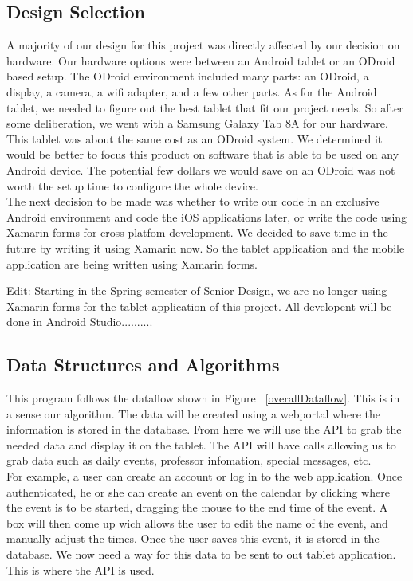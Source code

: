 \subsection{Design Selection}
A majority of our design for this project was directly affected by our decision on hardware.  Our hardware options were between an Android tablet or an ODroid based setup. The ODroid environment included many parts: an ODroid, a display, a camera, a wifi adapter, and a few other parts. As for the Android tablet, we needed to figure out the best tablet that fit our project needs. So after some deliberation, we went with a Samsung Galaxy Tab 8A for our hardware.  This tablet was about the same cost as an ODroid system.  We determined it would be better to focus this product on software that is able to be used on any Android device.  The potential few dollars we would save on an ODroid was not worth the setup time to configure the whole device.\\

The next decision to be made was whether to write our code in an exclusive Android environment and code the iOS applications later, or write the code using Xamarin forms for cross platfom development. We decided to save time in the future by writing it using Xamarin now. So the tablet application and the mobile application are being written using Xamarin forms.

Edit: Starting in the Spring semester of Senior Design, we are no longer using Xamarin forms for the tablet application of this project.  All developent will be done in Android Studio..........

 
\subsection{Data Structures and Algorithms}
This program follows the dataflow shown in Figure ~\ref{overallDataflow}. This is in a sense our algorithm.  The data will be created using a webportal where the information is stored in the database.  From here we will use the API to grab the needed data and display it on the tablet.  The API will have calls allowing us to grab data such as daily events, professor infomation, special messages, etc.\\

For example, a user can create an account or log in to the web application. Once authenticated, he or she can create an event on the calendar by clicking where the event is to be started, dragging the mouse to the end time of the event.  A box will then come up wich allows the user to edit the name of the event, and manually adjust the times.  Once the user saves this event, it is stored in the database.  We now need a way for this data to be sent to out tablet application.  This is where the API is used.\\ 

